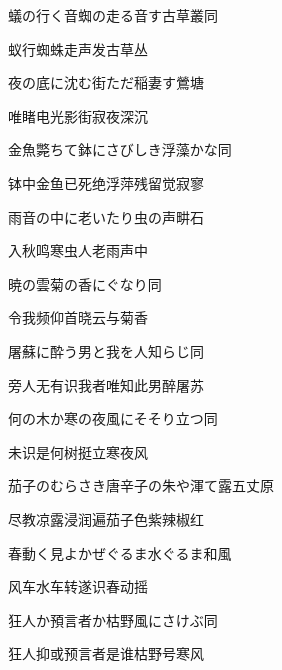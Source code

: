 \begin{haiku}
    {\FH 蟻の行く音蜘の走る音す古草叢}\hfill{\FH 同}

    {\FK 蚁行蜘蛛走声发古草丛}
\end{haiku}

\begin{haiku}
    {\FH 夜の底に沈む街ただ稲妻す}\hfill{\FH 鶯塘}

    {\FK 唯睹电光影街寂夜深沉}
\end{haiku}

\begin{haiku}
    {\FH 金魚斃ちて鉢にさびしき浮藻かな}\hfill{\FH 同}

    {\FK 钵中金鱼已死绝浮萍残留觉寂寥}
\end{haiku}

\begin{haiku}
    {\FH 雨音の中に老いたり虫の声}\hfill{\FH 畊石}

    {\FK 入秋鸣寒虫人老雨声中}
\end{haiku}

\begin{haiku}
    {\FH 暁の雲菊の香にぐなり}\hfill{\FH 同}

    {\FK 令我频仰首晓云与菊香}
\end{haiku}

\begin{haiku}
    {\FH 屠蘇に酔う男と我を人知らじ}\hfill{\FH 同}

    {\FK 旁人无有识我者唯知此男醉屠苏}
\end{haiku}

\begin{haiku}
    {\FH 何の木か寒の夜風にそそり立つ}\hfill{\FH 同}

    {\FK 未识是何树挺立寒夜风}
\end{haiku}

\begin{haiku}
    {\FH 茄子のむらさき唐辛子の朱や渾て露}\hfill{\FH 五丈原}

    {\FK 尽教凉露浸润遍茄子色紫辣椒红}
\end{haiku}

\begin{haiku}
    {\FH 春動く見よかぜぐるま水ぐるま}\hfill{\FH 和風}

    {\FK 风车水车转遂识春动摇}
\end{haiku}

\begin{haiku}
    {\FH 狂人か預言者か枯野風にさけぶ}\hfill{\FH 同}

    {\FK 狂人抑或预言者是谁枯野号寒风}
\end{haiku}

